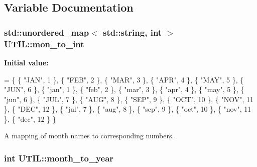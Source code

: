 \subsection{Variable Documentation}
\hypertarget{group__UTIL_ga044d0402087a045aabd076a5126699d2}{
\subsubsection[{mon\-\_\-to\-\_\-int}]{\setlength{\rightskip}{0pt plus 5cm}std\-::unordered\-\_\-map$<$ std\-::string, int $>$ U\-T\-I\-L\-::mon\-\_\-to\-\_\-int}}\label{group__UTIL_ga044d0402087a045aabd076a5126699d2}
{\bfseries Initial value\-:}
\begin{DoxyCode}
= \{
        \{ \textcolor{stringliteral}{"JAN"}, 1 \}, \{ \textcolor{stringliteral}{"FEB"}, 2 \}, \{ \textcolor{stringliteral}{"MAR"}, 3 \}, \{ \textcolor{stringliteral}{"APR"}, 4  \}, \{ \textcolor{stringliteral}{"MAY"}, 5  \}, \{ \textcolor{stringliteral}{"JUN"}, 6  \},
        \{ \textcolor{stringliteral}{"jan"}, 1 \}, \{ \textcolor{stringliteral}{"feb"}, 2 \}, \{ \textcolor{stringliteral}{"mar"}, 3 \}, \{ \textcolor{stringliteral}{"apr"}, 4  \}, \{ \textcolor{stringliteral}{"may"}, 5  \}, \{ \textcolor{stringliteral}{"jun"}, 6  \},
        \{ \textcolor{stringliteral}{"JUL"}, 7 \}, \{ \textcolor{stringliteral}{"AUG"}, 8 \}, \{ \textcolor{stringliteral}{"SEP"}, 9 \}, \{ \textcolor{stringliteral}{"OCT"}, 10 \}, \{ \textcolor{stringliteral}{"NOV"}, 11 \}, \{ \textcolor{stringliteral}{"DEC"}, 12 \},
        \{ \textcolor{stringliteral}{"jul"}, 7 \}, \{ \textcolor{stringliteral}{"aug"}, 8 \}, \{ \textcolor{stringliteral}{"sep"}, 9 \}, \{ \textcolor{stringliteral}{"oct"}, 10 \}, \{ \textcolor{stringliteral}{"nov"}, 11 \}, \{ \textcolor{stringliteral}{"dec"}, 12 \}
\}
\end{DoxyCode}
A mapping of month names to corresponding numbers. \hypertarget{group__UTIL_ga825bc9e6f0accf92a1b07431568a397c}{
\subsubsection[{month\-\_\-to\-\_\-year}]{\setlength{\rightskip}{0pt plus 5cm}int U\-T\-I\-L\-::month\-\_\-to\-\_\-year}}\label{group__UTIL_ga825bc9e6f0accf92a1b07431568a397c}
